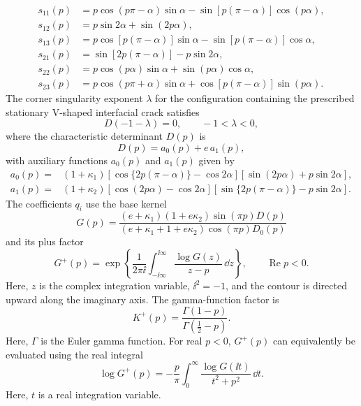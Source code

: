 \begin{equation*}
\begin{aligned}
  s_{11}(p)&=p\cos(p\pi-\alpha)\sin\alpha
             -\sin[p(\pi-\alpha)]\cos(p\alpha),\\
  s_{12}(p)&=p\sin2\alpha+\sin(2p\alpha),\\
  s_{13}(p)&=p\cos[p(\pi-\alpha)]\sin\alpha
             -\sin[p(\pi-\alpha)]\cos\alpha,\\
  s_{21}(p)&=\sin[2p(\pi-\alpha)]-p\sin2\alpha,\\
  s_{22}(p)&=p\cos(p\alpha)\sin\alpha
             +\sin(p\alpha)\cos\alpha,\\
  s_{23}(p)&=p\cos(p\pi+\alpha)\sin\alpha
             +\cos[p(\pi-\alpha)]\sin(p\alpha).
\end{aligned}
\end{equation*}
The corner singularity exponent $\lambda$ for the configuration
containing the prescribed stationary V-shaped interfacial crack satisfies
\begin{equation}
\label{eq:app-D-root}
  D(-1-\lambda)=0,
  \qquad -1<\lambda<0,
\end{equation}
where the characteristic determinant $D(p)$ is
\begin{equation*}
  D(p)=a_0(p)+e\,a_1(p),
\end{equation*}
with auxiliary functions $a_0(p)$ and $a_1(p)$ given by
\begin{equation*}
\begin{aligned}
  a_0(p)={}&(1+\kappa_1)
  [\cos\{2p(\pi-\alpha)\}-\cos2\alpha]
  [\sin(2p\alpha)+p\sin2\alpha],\\
  a_1(p)={}&(1+\kappa_2)
  [\cos(2p\alpha)-\cos2\alpha]
  [\sin\{2p(\pi-\alpha)\}-p\sin2\alpha].
\end{aligned}
\end{equation*}
The coefficients $q_i$ use the base kernel
\begin{equation*}
  G(p)=
  \frac{(e+\kappa_1)(1+e\kappa_2)\sin(\pi p)D(p)}
  {(e+\kappa_1+1+e\kappa_2)\cos(\pi p)D_0(p)}
\end{equation*}
and its plus factor
\begin{equation*}
  G^+(p)=
  \exp\!\left\{
    \frac{1}{2\pi\ii}
    \int_{-\ii\infty}^{\ii\infty}
    \frac{\log G(z)}{z-p}\,\dd z
  \right\},
  \qquad \operatorname{Re}p<0.
\end{equation*}
Here, $z$ is the complex integration variable, $\ii^2=-1$, and the contour
is directed upward along the imaginary axis. The gamma-function factor is
\begin{equation*}
  K^+(p)=\frac{\Gamma(1-p)}{\Gamma(\tfrac12-p)}.
\end{equation*}
Here, $\Gamma$ is the Euler gamma function. For real $p<0$, $G^+(p)$
can equivalently be evaluated using the real integral
\begin{equation*}
  \log G^+(p)
  =-\frac{p}{\pi}\int_0^\infty
    \frac{\log G(\ii t)}{t^2+p^2}\,\dd t.
\end{equation*}
Here, $t$ is a real integration variable.

